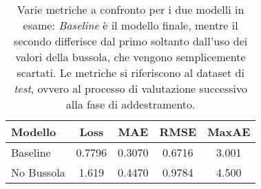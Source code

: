 \begin{table}[tbp]
  \centering
  \begin{tabular}{lcccc}
    \toprule
    Modello & Loss & MAE & RMSE & MaxAE \\
    \midrule
    Baseline      & 0.7796 & 0.3070 & 0.6716 & 3.001 \\
    No Bussola & 1.619 & 0.4470 & 0.9784 & 4.500 \\
    \bottomrule
  \end{tabular}
  \caption{Varie metriche a confronto per i due modelli in esame:
    \emph{Baseline} è il modello finale, mentre il secondo differisce dal primo
    soltanto dall'uso dei valori della bussola, che vengono semplicemente
    scartati. Le metriche si riferiscono al dataset di \emph{test}, ovvero al
    processo di valutazione successivo alla fase di addestramento.}%
  \label{tab:nocompass}%
\end{table}
